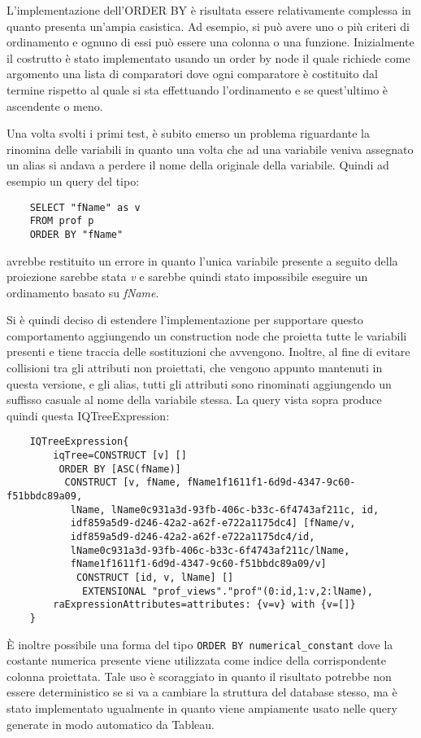 L'implementazione dell'ORDER BY è risultata essere relativamente complessa in quanto presenta un'ampia casistica. Ad esempio, si può avere uno o più criteri di ordinamento e
ognuno di essi può essere una colonna o una funzione. Inizialmente il costrutto è stato implementato usando un order by node il quale richiede come argomento una lista di comparatori
dove ogni comparatore è costituito dal termine rispetto al quale si sta effettuando l'ordinamento e se quest'ultimo è ascendente o meno.

Una volta svolti i primi test, è subito emerso un problema riguardante la rinomina delle variabili in quanto una volta che ad una variabile veniva assegnato un alias si andava a perdere
il nome della originale della variabile. Quindi ad esempio un query del tipo:
\begin{verbatim}
    SELECT "fName" as v
    FROM prof p 
    ORDER BY "fName"
\end{verbatim}
avrebbe restituito un errore in quanto l'unica variabile presente a seguito della proiezione sarebbe stata \textit{v} e sarebbe quindi stato impossibile eseguire un ordinamento basato su
\textit{fName}.

Si è quindi deciso di estendere l'implementazione per supportare questo comportamento aggiungendo un construction node che proietta tutte le variabili presenti e tiene traccia delle sostituzioni che
avvengono. Inoltre, al fine di evitare collisioni tra gli attributi non proiettati, che vengono appunto mantenuti in questa versione, e gli alias, tutti gli attributi sono rinominati aggiungendo un
suffisso casuale al nome della variabile stessa. La query vista sopra produce quindi questa IQTreeExpression:
\begin{verbatim}
    IQTreeExpression{
        iqTree=CONSTRUCT [v] []
         ORDER BY [ASC(fName)]
          CONSTRUCT [v, fName, fName1f1611f1-6d9d-4347-9c60-f51bbdc89a09, 
           lName, lName0c931a3d-93fb-406c-b33c-6f4743af211c, id, 
           idf859a5d9-d246-42a2-a62f-e722a1175dc4] [fName/v, 
           idf859a5d9-d246-42a2-a62f-e722a1175dc4/id, 
           lName0c931a3d-93fb-406c-b33c-6f4743af211c/lName, 
           fName1f1611f1-6d9d-4347-9c60-f51bbdc89a09/v]
            CONSTRUCT [id, v, lName] []
             EXTENSIONAL "prof_views"."prof"(0:id,1:v,2:lName), 
        raExpressionAttributes=attributes: {v=v} with {v=[]}
    } 
\end{verbatim}

\`E inoltre possibile una forma del tipo \verb+ORDER BY numerical_constant+ dove la costante numerica presente viene utilizzata come indice della corrispondente colonna proiettata. Tale
uso è scoraggiato in quanto il risultato potrebbe non essere deterministico se si va a cambiare la struttura del database stesso, ma è stato implementato ugualmente in quanto viene
ampiamente usato nelle query generate in modo automatico da Tableau.

